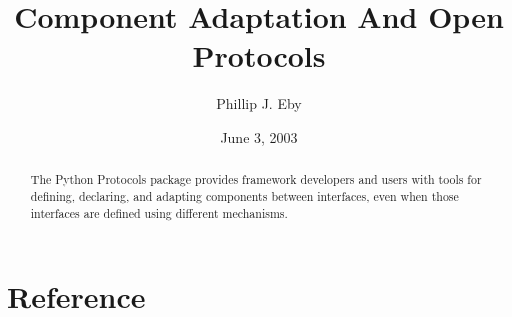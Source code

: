 \documentclass{manual}
\title{Component Adaptation And Open Protocols}
\author{Phillip J. Eby}
\date{June 3, 2003}       %
\begin{document}
\maketitle


%

\begin{abstract}

\noindent

The Python Protocols package provides framework developers and users with
tools for defining, declaring, and adapting components between interfaces,
even when those interfaces are defined using different mechanisms.

\end{abstract}

\tableofcontents

\chapter{Reference}













%
%
%
\renewcommand{\indexname}{Module Index}

\renewcommand{\indexname}{Index}
\end{document}
